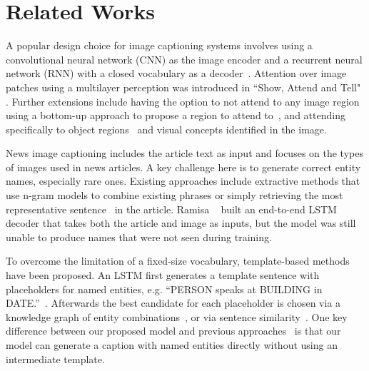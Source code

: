 
\section{Related Works}

A popular design choice for image captioning systems involves using a
convolutional neural network (CNN) as the image encoder and a recurrent neural
network (RNN) with a closed vocabulary as a decoder~\cite{Karpathy2015DeepVA,
   Donahue2015LongTR, Vinyals2015ShowAT}. Attention over image patches using a
multilayer perception was introduced in ``Show, Attend and Tell"
\cite{Xu2015ShowAA}. Further extensions include having the option to not attend
to any image region~\cite{Lu2017KnowingWT} using a bottom-up approach to
propose a region to attend to~\cite{Anderson2017BottomUpAT}, and attending
specifically to object regions~\cite{Wang2019Hierarchical} and visual concepts
\cite{You2016ImageCW,Li2019Boosted,Wang2019Hierarchical} identified in the
image.




News image captioning includes the article text as input and focuses on the
types of images used in news articles. A key challenge here is to generate
correct entity names, especially rare ones. Existing approaches include
extractive methods that use n-gram models to combine existing phrases
\cite{Feng2013AutomaticCG} or simply retrieving the most representative
sentence~\cite{Tariq2017ACE} in the article. Ramisa
\etal~\cite{Ramisa2016BreakingNewsAA} built an end-to-end LSTM decoder that
takes both the article and image as inputs, but the model was still unable to
produce names that were not seen during training.

To overcome the limitation of a fixed-size vocabulary, template-based methods
have been proposed. An LSTM first generates a template
sentence with placeholders for named entities, e.g. ``PERSON speaks at BUILDING
in DATE.''~\cite{Biten2019GoodNews}. Afterwards the best candidate for each
placeholder is chosen via a knowledge graph of entity
combinations~\cite{Lu2018EntityAI}, or via sentence
similarity~\cite{Biten2019GoodNews}. One key difference between our proposed
model and previous approaches~\cite{Biten2019GoodNews,Lu2018EntityAI}
is that our model can generate a caption with named entities directly without
using an intermediate template.

